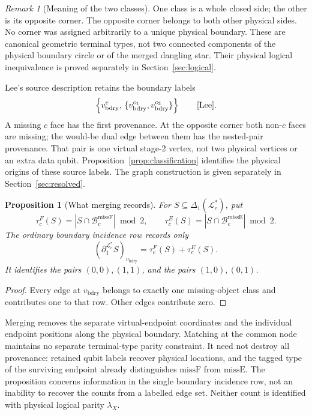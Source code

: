 \documentclass[11pt]{article}
\theoremstyle{definition}
\theoremstyle{plain}
\newtheorem{proposition}[definition]{Proposition}
\theoremstyle{remark}
\newtheorem{remark}[definition]{Remark}
\newcommand{\LL}{\mathcal L}
\newcommand{\bd}{v_{\mathrm{bdry}}}
\newcommand{\missF}{\mathrm{missF}}
\newcommand{\missE}{\mathrm{missE}}
\begin{document}
\begin{remark}[Meaning of the two classes]\label{rem:types}
One class is a whole closed side; the other is its opposite corner.
The opposite corner belongs to both other physical sides. No corner
was assigned arbitrarily to a unique physical boundary.
These are canonical geometric terminal types, not two connected
components of the physical boundary circle or of the merged dangling
star. Their physical logical inequivalence is proved separately in
Section~\ref{sec:logical}.

Lee's source description retains the boundary labels
\[
 \left\{v_{\mathrm{bdry}}^c,\,
        \{v_{\mathrm{bdry}}^{c_1},v_{\mathrm{bdry}}^{c_2}\}\right\}
 \qquad\text{\cite[Appendix~A.3, pp.~22--23]{Lee}.}
\]
A missing $c$ face has the first provenance. At the opposite corner
both non-$c$ faces are missing; the would-be dual edge between them
has the nested-pair provenance. That pair is one virtual stage-2 vertex,
not two physical vertices or an extra data qubit.
Proposition~\ref{prop:classification} identifies the physical origins
of these source labels. The graph construction is given separately
in Section~\ref{sec:resolved}.
\end{remark}

\begin{proposition}[What merging records]\label{prop:merging}
For $S\subseteq\Delta_1(\LL_c^*)$, put
\[
 \tau_c^F(S)=|S\cap\mathcal B_c^{\missF}|\bmod2,\qquad
 \tau_c^E(S)=|S\cap\mathcal B_c^{\missE}|\bmod2 .
\]
The ordinary boundary incidence row records only
\[
 (\partial_1^{\LL_c^*}S)_{\bd}=\tau_c^F(S)+\tau_c^E(S).
\]
It identifies the pairs $(0,0),(1,1)$, and the pairs $(1,0),(0,1)$.
\end{proposition}
\begin{proof}
Every edge at $\bd$ belongs to exactly one missing-object class and
contributes one to that row. Other edges contribute zero.
\end{proof}

Merging removes the separate virtual-endpoint coordinates and the
individual endpoint positions along the physical boundary. Matching
at the common node maintains no separate terminal-type parity constraint.
It need not destroy all provenance: retained qubit labels recover
physical locations, and the tagged type of the surviving endpoint
already distinguishes $\missF$ from $\missE$.
The proposition concerns information in the single boundary incidence
row, not an inability to recover the counts from a labelled edge set.
Neither count is identified with physical logical parity $\lambda_X$.
\end{document}
